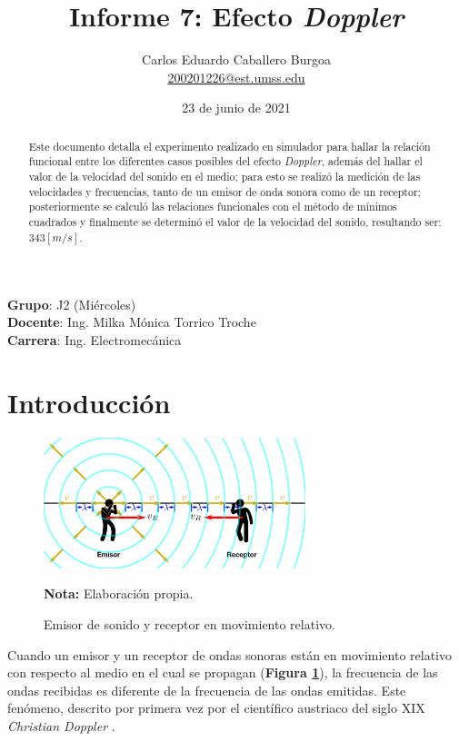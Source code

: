 \documentclass[letter,11pt]{article}
\title{Informe 7: Efecto \emph{Doppler}}
\author{Carlos Eduardo Caballero Burgoa \\
    \small{\href{mailto:200201226@est.umss.edu}{200201226@est.umss.edu}}
}
\date{23 de junio de 2021}
\newcommand{\source}[1]{\vspace{-11pt} \caption*{\small{\textbf{Nota:} {#1}}}}
\begin{document}
\maketitle
\begin{center}
    \textbf{Grupo}: J2 (Miércoles)\\
    \textbf{Docente}: Ing. Milka Mónica Torrico Troche\\
    \textbf{Carrera}: Ing. Electromecánica
\end{center}

\begin{abstract}
Este documento detalla el experimento realizado en simulador para hallar la
relación funcional entre los diferentes casos posibles del efecto
\emph{Doppler}, además del hallar el valor de la velocidad del sonido en el
medio; para esto se realizó la medición de las velocidades y frecuencias, tanto
de un emisor de onda sonora como de un receptor; posteriormente se calculó las
relaciones funcionales con el método de mínimos cuadrados y finalmente se
determinó el valor de la velocidad del sonido, resultando ser: $343 [m/s]$.
\end{abstract}

\section{Introducción}

\begin{figure}
\centering
\includegraphics[width=0.68\textwidth]{resources/f1.eps}
\caption{Emisor de sonido y receptor en movimiento relativo.}
\label{figura1}
\source{Elaboración propia.}
\end{figure}

Cuando un emisor y un receptor de ondas sonoras están en movimiento relativo con
respecto al medio en el cual se propagan (\textbf{Figura \ref{figura1}}), la
frecuencia de las ondas recibidas es diferente de la frecuencia de las ondas
emitidas. Este fenómeno, descrito por primera vez por el científico austriaco
del siglo XIX \emph{Christian Doppler} \cite{Young&Freedman}.
\end{document}
